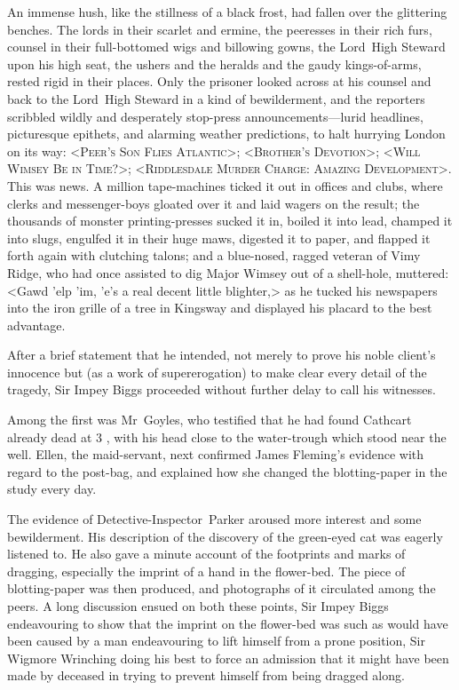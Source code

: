 An immense hush, like the stillness of a black frost, had fallen over the glittering benches. The lords in their scarlet and ermine, the peeresses in their rich furs, counsel in their full-bottomed wigs and billowing gowns, the Lord~High Steward upon his high seat, the ushers and the heralds and the gaudy kings-of-arms, rested rigid in their places. Only the prisoner looked across at his counsel and back to the Lord~High Steward in a kind of bewilderment, and the reporters scribbled wildly and desperately stop-press announcements—lurid headlines, picturesque epithets, and alarming weather predictions, to halt hurrying London on its way: <\textsc{Peer's Son Flies Atlantic}>; <\textsc{Brother's Devotion}>; <\textsc{Will Wimsey Be in Time?}>; <\textsc{Riddlesdale Murder Charge: Amazing Development}>. This was news. A million tape-machines ticked it out in offices and clubs, where clerks and messenger-boys gloated over it and laid wagers on the result; the thousands of monster printing-presses sucked it in, boiled it into lead, champed it into slugs, engulfed it in their huge maws, digested it to paper, and flapped it forth again with clutching talons; and a blue-nosed, ragged veteran of Vimy Ridge, who had once assisted to dig Major Wimsey out of a shell-hole, muttered: <Gawd 'elp 'im, 'e's a real decent little blighter,> as he tucked his newspapers into the iron grille of a tree in Kingsway and displayed his placard to the best advantage.

After a brief statement that he intended, not merely to prove his noble client's innocence but (as a work of supererogation) to make clear every detail of the tragedy, Sir Impey Biggs proceeded without further delay to call his witnesses.

Among the first was Mr~Goyles, who testified that he had found Cathcart already dead at 3 , with his head close to the water-trough which stood near the well. Ellen, the maid-servant, next confirmed James Fleming's evidence with regard to the post-bag, and explained how she changed the blotting-paper in the study every day.

The evidence of Detective-Inspector~Parker aroused more interest and some bewilderment. His description of the discovery of the green-eyed cat was eagerly listened to. He also gave a minute account of the footprints and marks of dragging, especially the imprint of a hand in the flower-bed. The piece of blotting-paper was then produced, and photographs of it circulated among the peers. A long discussion ensued on both these points, Sir Impey Biggs endeavouring to show that the imprint on the flower-bed was such as would have been caused by a man endeavouring to lift himself from a prone position, Sir Wigmore Wrinching doing his best to force an admission that it might have been made by deceased in trying to prevent himself from being dragged along.

